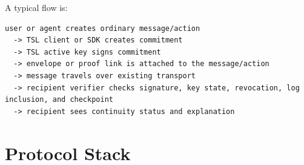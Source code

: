 \documentclass[11pt]{article}
\begin{document}
A typical flow is:

\begin{lstlisting}[style=tslcode]
user or agent creates ordinary message/action
  -> TSL client or SDK creates commitment
  -> TSL active key signs commitment
  -> envelope or proof link is attached to the message/action
  -> message travels over existing transport
  -> recipient verifier checks signature, key state, revocation, log inclusion, and checkpoint
  -> recipient sees continuity status and explanation
\end{lstlisting}

\section{Protocol Stack}
\end{document}
